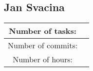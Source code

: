 \documentclass{article}
\begin{document}
    \subsection*{Jan Svacina}

    \begin{center}
        \begin{tabular}{||c c ||}
            \hline
            Number of tasks: &  \\
            \hline
            Number of commits: &  \\
            \hline
            Number of hours: &  \\
            \hline
        \end{tabular}
    \end{center}
\end{document}
